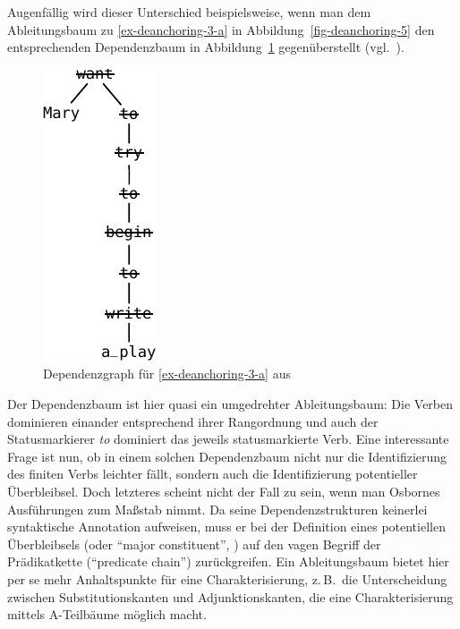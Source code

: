 Augenfällig wird dieser Unterschied beispielsweise, wenn man dem Ableitungsbaum zu \ref{ex-deanchoring-3-a} in Abbildung~\ref{fig-deanchoring-5} den entsprechenden Dependenzbaum in Abbildung~\ref{fig-deanchroing-8} gegenüberstellt (vgl.\ \citealt[(110)]{Osborne:08}).
\begin{figure}[t]
\centering
\includegraphics{graphics/abb821.pdf}
\caption{\label{fig-deanchroing-8}Dependenzgraph für \ref{ex-deanchoring-3-a} aus \citet[(110)]{Osborne:08}}
\end{figure}
Der Dependenzbaum ist hier quasi ein umgedrehter Ableitungsbaum: Die Verben dominieren einander entsprechend ihrer Rangordnung und auch der Statusmarkierer {\it to} dominiert das jeweils statusmarkierte Verb. Eine interessante Frage ist nun, ob in einem solchen Dependenzbaum nicht nur die Identifizierung des finiten Verbs leichter fällt, sondern auch die Identifizierung potentieller Überbleibsel. Doch letzteres scheint nicht der Fall zu sein, wenn man Osbornes Ausführungen zum Ma\ss stab nimmt. Da seine Dependenzstrukturen keinerlei syntaktische Annotation aufweisen, muss er bei der Definition eines potentiellen Überbleibsels (oder "`major constituent"', \citealt[1146]{Osborne:08}) auf den vagen Begriff der Prädikatkette ("`predicate chain"') zurückgreifen. Ein Ableitungsbaum bietet hier per se mehr Anhaltspunkte für eine Charakterisierung, z.\,B.\ die Unterscheidung zwischen Substitutionskanten und Adjunktionskanten, die eine Charakterisierung mittels A-Teilbäume möglich macht.

